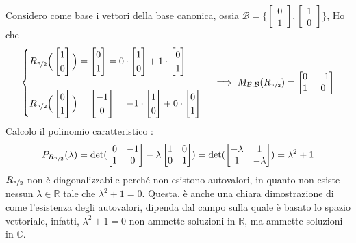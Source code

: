 \documentclass[12pt, letterpaper]{article}
\newcommand{\R}{{\mathbb R}}
\newcommand{\B}{{\mathcal B}}
\newcommand{\acc}{\\\hphantom{}\\}
\begin{document}
Considero come base i vettori della base canonica, ossia \(\B=\{\begin{bmatrix}0\\1\end{bmatrix},\begin{bmatrix}1\\0\end{bmatrix}\}\),
Ho che $$
\begin{cases}
    R_{\nicefrac{\pi}{2}}\Big(\begin{bmatrix}1\\0\end{bmatrix}\Big)=\begin{bmatrix}0\\1\end{bmatrix}=0\cdot\begin{bmatrix}1\\0\end{bmatrix}+1\cdot \begin{bmatrix}0\\1\end{bmatrix}\\
    \\R_{\nicefrac{\pi}{2}}\Big(\begin{bmatrix}0\\1\end{bmatrix}\Big)=\begin{bmatrix}-1\\0\end{bmatrix}=-1\cdot\begin{bmatrix}1\\0\end{bmatrix}+0\cdot \begin{bmatrix}0\\1\end{bmatrix}
\end{cases}\implies M_{\B,\B}(R_{\nicefrac{\pi}{2}})=\begin{bmatrix}
    0&-1\\1&0
\end{bmatrix}
$$
Calcolo il polinomio caratteristico : $$
P_{R_{\nicefrac{\pi}{2}}}(\lambda)=\det(\begin{bmatrix}0&-1\\1&0\end{bmatrix}-\lambda \begin{bmatrix}1&0\\0&1\end{bmatrix})=\det(\begin{bmatrix}-\lambda&1\\1&-\lambda\end{bmatrix})=\lambda^2+1
$$
\(R_{\nicefrac{\pi}{2}}\) non è diagonalizzabile perché non esistono autovalori, in quanto non esiste nessun \(\lambda\in\R\)
tale che \(\lambda^2+1=0\). Questa, è anche una chiara dimostrazione di come l'esistenza degli autovalori, dipenda dal campo 
sulla quale è basato lo spazio vettoriale, infatti, \(\lambda^2+1=0\) non ammette soluzioni in \(\R\), ma ammette 
soluzioni in \(\mathbb{C}\).\acc 
\end{document}
